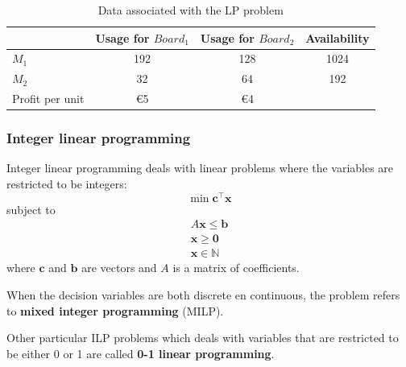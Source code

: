 \begin{table}[h!]
\begin{center}
\caption{Data associated with the LP problem}
\begin{tabular}{|l|c|c|c|}
\hline
& Usage for $Board_1$ & Usage for $Board_2$ & Availability\\
\hline
$M_1$ & 192 & 128 & 1024 \\
$M_2$ & 32 & 64 & 192 \\
Profit per unit & \euro 5 & \euro 4 & \\
\hline
\end{tabular}
\label{tab:ex_lp}
\end{center}
\end{table}

\subsubsection{Integer linear programming}
Integer linear programming deals with linear problems where the variables are restricted to be integers:
\begin{equation}
\min \mathbf{c}^\intercal\mathbf{x}
\end{equation}
subject to
\begin{equation*}
\begin{gathered}
A\mathbf{x} \leq \mathbf{b}\\
\mathbf{x} \geq \mathbf{0}\\
\mathbf{x} \in \mathbb{N}
\end{gathered}
\end{equation*}
where $\mathbf{c}$ and $\mathbf{b}$ are vectors and $A$ is a matrix of coefficients.

When the decision variables are both discrete en continuous, the problem refers to \textbf{mixed integer programming} (MILP).

Other particular ILP problems which deals with variables that are restricted to be either 0 or 1 are called \textbf{0-1 linear programming}.

